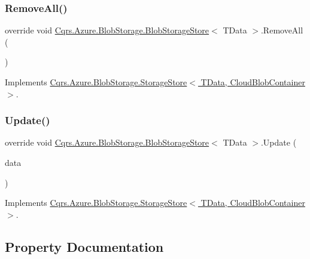 \subsubsection{\texorpdfstring{Remove\+All()}{RemoveAll()}}
{\footnotesize\ttfamily override void \hyperlink{classCqrs_1_1Azure_1_1BlobStorage_1_1BlobStorageStore}{Cqrs.\+Azure.\+Blob\+Storage.\+Blob\+Storage\+Store}$<$ T\+Data $>$.Remove\+All (\begin{DoxyParamCaption}{ }\end{DoxyParamCaption})\hspace{0.3cm}{\ttfamily [virtual]}}



Implements \hyperlink{classCqrs_1_1Azure_1_1BlobStorage_1_1StorageStore_a4e848f342be903293812b3b660464d1a_a4e848f342be903293812b3b660464d1a}{Cqrs.\+Azure.\+Blob\+Storage.\+Storage\+Store$<$ T\+Data, Cloud\+Blob\+Container $>$}.

\mbox{\label{classCqrs_1_1Azure_1_1BlobStorage_1_1BlobStorageStore_a03be976aded454866b4589de99a9e1c8_a03be976aded454866b4589de99a9e1c8}} 
\subsubsection{\texorpdfstring{Update()}{Update()}}
{\footnotesize\ttfamily override void \hyperlink{classCqrs_1_1Azure_1_1BlobStorage_1_1BlobStorageStore}{Cqrs.\+Azure.\+Blob\+Storage.\+Blob\+Storage\+Store}$<$ T\+Data $>$.Update (\begin{DoxyParamCaption}\item[{T\+Data}]{data }\end{DoxyParamCaption})\hspace{0.3cm}{\ttfamily [virtual]}}



Implements \hyperlink{classCqrs_1_1Azure_1_1BlobStorage_1_1StorageStore_ae9ca8bfe30040f77e349a4d47b31da70_ae9ca8bfe30040f77e349a4d47b31da70}{Cqrs.\+Azure.\+Blob\+Storage.\+Storage\+Store$<$ T\+Data, Cloud\+Blob\+Container $>$}.



\subsection{Property Documentation}
\mbox{\label{classCqrs_1_1Azure_1_1BlobStorage_1_1BlobStorageStore_af4f4ed2c32ce521ebf164e63ef453b9c_af4f4ed2c32ce521ebf164e63ef453b9c}} 
